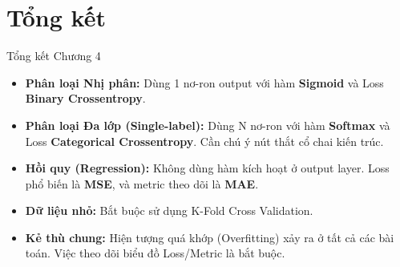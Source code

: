\documentclass[aspectratio=169]{beamer}
\begin{document}
\section{Tổng kết}

\begin{frame}{Tổng kết Chương 4}
    \begin{itemize}
        \item \textbf{Phân loại Nhị phân:} Dùng 1 nơ-ron output với hàm \textbf{Sigmoid} và Loss \textbf{Binary Crossentropy}.
        \item \textbf{Phân loại Đa lớp (Single-label):} Dùng N nơ-ron với hàm \textbf{Softmax} và Loss \textbf{Categorical Crossentropy}. Cần chú ý nút thắt cổ chai kiến trúc.
        \item \textbf{Hồi quy (Regression):} Không dùng hàm kích hoạt ở output layer. Loss phổ biến là \textbf{MSE}, và metric theo dõi là \textbf{MAE}.
        \item \textbf{Dữ liệu nhỏ:} Bắt buộc sử dụng K-Fold Cross Validation.
        \item \textbf{Kẻ thù chung:} Hiện tượng quá khớp (Overfitting) xảy ra ở tất cả các bài toán. Việc theo dõi biểu đồ Loss/Metric là bắt buộc.
    \end{itemize}
\end{frame}
\end{document}
